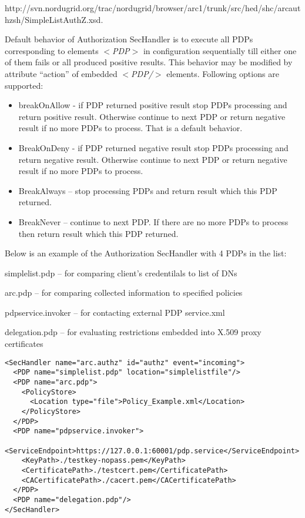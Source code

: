 \documentclass{book}
\begin{document}
http://svn.nordugrid.org/trac/nordugrid/browser/arc1/trunk/src/hed/shc/arcauthzsh/SimpleListAuthZ.xsd.

Default behavior of Authorization SecHandler is to execute all PDPs corresponding to elements \textit{$<$PDP$>$} in configuration sequentially till either one of them fails or all produced positive results. This behavior may be modified by attribute ``action'' of embedded \textit{$<$PDP/$>$} elements. Following options are supported:

    \begin{itemize}
        \item breakOnAllow - if PDP returned positive result stop PDPs processing and return positive result. Otherwise continue to next PDP or return negative result if no more PDPs to process. That is a default behavior.
        \item BreakOnDeny - if PDP returned negative result stop PDPs processing and return negative result. Otherwise continue to next PDP or return negative result if no more PDPs to process.
        \item BreakAlways – stop processing PDPs and return result which this PDP returned.
        \item BreakNever – continue to next PDP. If there are no more PDPs to process then return result which this PDP returned.
    \end{itemize}

Below is an example of the Authorization SecHandler with 4 PDPs in the list:

simplelist.pdp – for comparing client's credentilals to list of DNs

arc.pdp – for comparing collected information to specified policies

pdpservice.invoker – for contacting external PDP service.xml

delegation.pdp – for evaluating restrictions embedded into X.509 proxy certificates

\begin{verbatim}
<SecHandler name="arc.authz" id="authz" event="incoming">
  <PDP name="simplelist.pdp" location="simplelistfile"/>
  <PDP name="arc.pdp">
    <PolicyStore>
      <Location type="file">Policy_Example.xml</Location>
    </PolicyStore>
  </PDP>
  <PDP name="pdpservice.invoker">
    <ServiceEndpoint>https://127.0.0.1:60001/pdp.service</ServiceEndpoint>
    <KeyPath>./testkey-nopass.pem</KeyPath>
    <CertificatePath>./testcert.pem</CertificatePath>
    <CACertificatePath>./cacert.pem</CACertificatePath>
  </PDP>
  <PDP name="delegation.pdp"/>
</SecHandler>
\end{verbatim}
\end{document}
